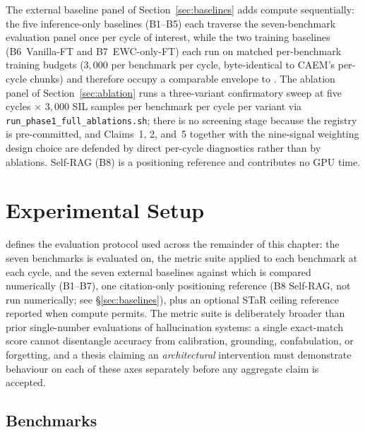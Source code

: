 The external baseline panel of Section~\ref{sec:baselines} adds compute sequentially: the five inference-only baselines (B1--B5) each traverse the seven-benchmark evaluation panel once per cycle of interest, while the two training baselines (B6~Vanilla-FT and B7~EWC-only-FT) each run on matched per-benchmark training budgets ($3{,}000$ per benchmark per cycle, byte-identical to CAEM's per-cycle chunks) and therefore occupy a comparable envelope to \caem{}. The ablation panel of Section~\ref{sec:ablation} runs a three-variant confirmatory sweep at five cycles $\times$ $3{,}000$ SIL samples per benchmark per cycle per variant via \texttt{run\_phase1\_full\_ablations.sh}; there is no screening stage because the registry is pre-committed, and Claims~1, 2, and~5 together with the nine-signal weighting design choice are defended by direct per-cycle diagnostics rather than by ablations. Self-RAG (B8) is a positioning reference and contributes no GPU time.

\section{Experimental Setup}
\label{sec:exp-setup}

 defines the evaluation protocol used across the
remainder of this chapter: the seven benchmarks \caem{} is evaluated on,
the metric suite applied to each benchmark at each cycle, and the seven
external baselines against which \caem{} is compared numerically
(B1--B7), one citation-only positioning reference (B8 Self-RAG, not run
numerically; see \S\ref{sec:baselines}), plus an optional STaR ceiling
reference reported when compute permits. The
metric suite is deliberately broader than prior single-number
evaluations of hallucination systems: a single exact-match score cannot
disentangle accuracy from calibration, grounding, confabulation, or
forgetting, and a thesis claiming an \emph{architectural} intervention
must demonstrate behaviour on each of these axes separately before any
aggregate claim is accepted.

\subsection{Benchmarks}
\label{sec:benchmarks}

